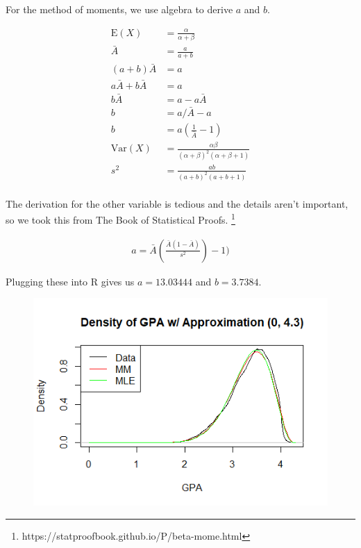 \documentclass[12pt, a4paper, oneside]{report}
\begin{document}
For the method of moments, we use algebra to derive $a$ and $b$.

\begin{align*}
  \mathrm{E}(X) &= \frac{\alpha}{\alpha+\beta} \\
  \bar{A} &= \frac{a}{a+b} \\
  (a + b)\bar{A} &= a \\
  a\bar{A} + b\bar{A} &= a \\
  b\bar{A} &= a - a\bar{A} \\
  b &= a / \bar{A} - a \\
  b &= a \left( \frac{1}{\bar{A}} - 1 \right) \\
  \mathrm{Var}(X) &= \frac{\alpha\beta}{(\alpha+\beta)^2 (\alpha+\beta+1)} \\
  s^2 &= \frac{ab}{(a+b)^2 (a+b+1)} \\
\end{align*}

The derivation for the other variable is tedious and the details aren't important, so we took this from The Book of Statistical Proofs.
\footnote{https://statproofbook.github.io/P/beta-mome.html}

\begin{align*}
  a = \bar{A}(\frac{\bar{A}(1-\bar{A})}{s^2})-1)
\end{align*}

Plugging these into R gives us $a = 13.03444$ and $b = 3.7384$.

\begin{figure}[h]
  \centering
  \includegraphics[width=\linewidth]{betaDensityA43.png}
\end{figure}
\newpage
\end{document}
